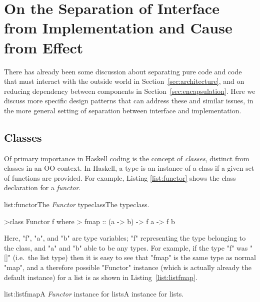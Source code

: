 \section[On the Separation of Interface from Implementation and Cause from Effect]{On the Separation of Interface from Implementation and Cause from Effect}
\label{sec:pure}

There has already been some discussion about separating pure code and code that must interact with the outside world in Section~\ref{sec:architecture}, and on reducing dependency between components in Section~\ref{sec:encapsulation}. Here we discuss more specific design patterns that can address these and similar issues, in the more general setting of separation between interface and implementation.

\subsection{Classes}

Of primary importance in Haskell coding is the concept of \emph{classes}, distinct from classes in an OO context. In Haskell, a type is an instance of a class if a given set of functions are provided. For example, Listing \ref{list:functor} shows the class declaration for a \emph{functor}.

\vspace{-0.5em}
\begin{listing}{list:functor}{The \emph{Functor} typeclass}{The  typeclass.}{}
\end{listing}\vspace{-1.5em}

\begin{haskell}
>class Functor f where
>  fmap :: (a -> b) -> f a -> f b

\end{haskell}
\noindent Here, "f", "a", and "b" are type variables; "f" representing the type belonging to the class, and "a" and "b" able to be any types. For example, if the type "f" was "[]" (i.e.\ the list type) then it is easy to see that "fmap" is the same type as normal "map", and a therefore possible "Functor" instance (which is actually already the default instance) for a list is as shown in Listing~\ref{list:listfmap}.

\vspace{-0.5em}
\begin{listing}{list:listfmap}{A \emph{Functor} instance for lists}{A  instance for lists.}{}
\end{listing}\vspace{-1.5em}


